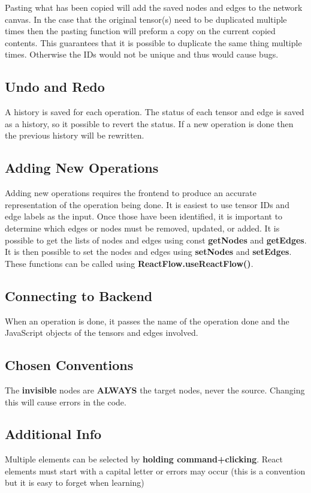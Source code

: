 \documentclass{juliacon}
\begin{document}
\begin{appendix}
Pasting what has been copied will add the saved nodes and edges to the network canvas. In the case that the original tensor(s) need to be duplicated multiple times then the pasting function will preform a copy on the current copied contents. This guarantees that it is possible to duplicate the same thing multiple times. Otherwise the IDs would not be unique and thus would cause bugs. 


\subsection{Undo and Redo}
A history is saved for each operation. The status of each tensor and edge is saved as a history, so it possible to revert the status. If a new operation is done then the previous history will be rewritten.

\subsection{Adding New Operations}
Adding new operations requires the frontend to produce an accurate representation of the operation being done. It is easiest to use tensor IDs and edge labels as the input. Once those have been identified, it is important to determine which edges or nodes must be removed, updated, or added. It is possible to get the lists of nodes and edges using const \textbf{getNodes} and \textbf{getEdges}. It is then possible to set the nodes and edges using \textbf{setNodes} and \textbf{setEdges}. These functions can be called using \textbf{ ReactFlow.useReactFlow()}.

\subsection{Connecting to Backend}
When an operation is done, it passes the name of the operation done and the JavaScript objects of the tensors and edges involved.

\subsection{Chosen Conventions}
The \textbf{invisible} nodes are \textbf{ALWAYS} the target nodes, never the source. Changing this will cause errors in the code.

\subsection{Additional Info}
Multiple elements can be selected by \textbf{holding command+clicking}. React elements must start with a capital letter or errors may occur (this is a convention but it is easy to forget when learning)



\end{appendix}
\end{document}
